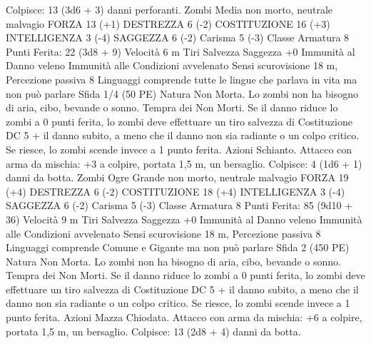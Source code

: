 \begin{multicols}{2}
Colpisce: 13 (3d6 + 3) danni perforanti.
Zombi
Media non morto, neutrale malvagio
FORZA 13 (+1)
DESTREZZA 6 (-2)
COSTITUZIONE 16 (+3)
INTELLIGENZA 3 (-4)
SAGGEZZA 6 (-2)
Carisma 5 (-3)
Classe Armatura 8
\hspace*{0pt}\hfill{Punti Ferita}: 22 (3d8 + 9)
Velocità 6 m
Tiri Salvezza Saggezza +0
Immunità al Danno veleno
Immunità alle Condizioni avvelenato
Sensi scurovisione 18 m, Percezione passiva 8
Linguaggi comprende tutte le lingue che parlava in vita ma non
può parlare
Sfida 1/4 (50 PE)
Natura Non Morta. Lo zombi non ha bisogno di aria, cibo,
bevande o sonno.
Tempra dei Non Morti. Se il danno riduce lo zombi a 0 punti
ferita, lo zombi deve effettuare un tiro salvezza di Costituzione
DC 5 + il danno subito, a meno che il danno non sia radiante o
un colpo critico. Se riesce, lo zombi scende invece a 1 punto
ferita.
Azioni
Schianto. Attacco con arma da mischia: +3 a colpire, portata 1,5
m, un bersaglio.
Colpisce: 4 (1d6 + 1) danni da botta.
Zombi Ogre
Grande non morto, neutrale malvagio
FORZA 19 (+4)
DESTREZZA 6 (-2)
COSTITUZIONE 18 (+4)
INTELLIGENZA 3 (-4)
SAGGEZZA 6 (-2)
Carisma 5 (-3)
Classe Armatura 8
\hspace*{0pt}\hfill{Punti Ferita}: 85 (9d10 + 36)
Velocità 9 m
Tiri Salvezza Saggezza +0
Immunità al Danno veleno
Immunità alle Condizioni avvelenato
Sensi scurovisione 18 m, Percezione passiva 8
Linguaggi comprende Comune e Gigante ma non può parlare
Sfida 2 (450 PE)
Natura Non Morta. Lo zombi non ha bisogno di aria, cibo,
bevande o sonno.
Tempra dei Non Morti. Se il danno riduce lo zombi a 0 punti
ferita, lo zombi deve effettuare un tiro salvezza di Costituzione
DC 5 + il danno subito, a meno che il danno non sia radiante o
un colpo critico. Se riesce, lo zombi scende invece a 1 punto
ferita.
Azioni
Mazza Chiodata. Attacco con arma da mischia: +6 a colpire,
portata 1,5 m, un bersaglio.
Colpisce: 13 (2d8 + 4) danni da botta.
 

\end{multicols}
